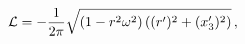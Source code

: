 \begin{equation}
\label{lagflat}
{\cal L}=-\frac{1}{2\pi} \sqrt{\left(1-r^2 \omega^2\right)\left( (r^\prime)^2
+ (x_3^\prime)^2\right)}\,,
\end{equation}

